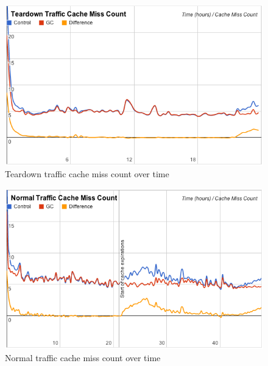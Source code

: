 \documentclass[12pt]{ucthesis}
\begin{document}
\begin{figure}[htp]
\centering
\includegraphics[width=\textwidth]{assets/teardownMissCountXTime.png}
\caption{Teardown traffic cache miss count over time}
\label{fig:teardownMissCountXTime}
\end{figure}
\begin{figure}[htp]
\centering
\includegraphics[width=\textwidth]{assets/normalMissCountXTime.png}
\caption{Normal traffic cache miss count over time}
\label{fig:normalMissCountXTime}
\end{figure}
\end{document}
